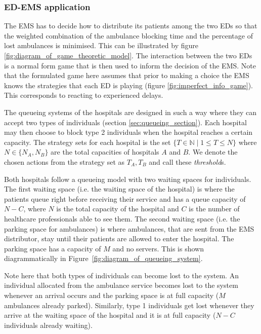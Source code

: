 \subsubsection{ED-EMS application}\label{sec:game_ems_es_application}

The EMS has to decide how to distribute its patients among the two EDs so that
the weighted combination of the ambulance blocking time and the percentage of
lost ambulances is minimised.
This can be illustrated by figure \ref{fig:diagram_of_game_theoretic_model}.
The interaction between the two
EDs is a normal form game that is then used to inform the decision of the EMS.
Note that the formulated game here assumes that prior to making a choice the
EMS knows the strategies that each ED is playing (figure
\ref{fig:imperfect_info_game}).
This corresponds to reacting to experienced delays.

The queueing systems of the hospitals are designed in such a way where they can
accept two types of individuals (section \ref{sec:queueing_section}).
Each hospital may then choose to block type 2 individuals
when the hospital reaches a certain capacity.
The strategy sets for each hospital is the set
\( \{T \in \mathbb{N} \;|\; 1 \leq T \leq N\} \) where \(N \in\{N_A, N_B\}\) are
the total capacities of hospitals \(A\) and \(B\).
We denote the chosen actions from the strategy set as \(T_A, T_B\) and call
these \textit{threshold}s.

Both hospitals follow a queueing model with two waiting spaces for
individuals.
The first waiting space (i.e. the waiting space of the hospital) is where the
patients queue right before receiving
their service and has a queue capacity of \( N - C \), where \(N\) is the total
capacity of the hospital and \(C\) is the number of healthcare
professionals able to see them.
The second waiting space (i.e. the parking space for ambulances) is where
ambulances, that are sent from the
EMS distributor, stay until their patients are allowed to enter the hospital.
The parking space has a capacity of \(M\) and no servers.
This is shown diagrammatically in Figure~\ref{fig:diagram_of_queueing_system}.

Note here that both types of individuals can become lost to the system.
An individual allocated from the ambulance service becomes lost to the system
whenever
an arrival occurs and the parking space is at full capacity (\(M\)
ambulances already parked).
Similarly, type 1 individuals get lost whenever they arrive at the waiting
space of the hospital and it is at full capacity (\(N - C\) individuals already
waiting).
